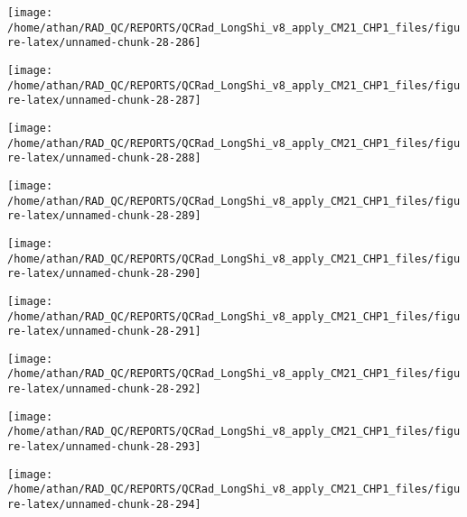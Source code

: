 \documentclass[
  10pt,
  a4paper,oneside]{article}
\begin{document}
\begin{center}\texttt{[image: /home/athan/RAD\_QC/REPORTS/QCRad\_LongShi\_v8\_apply\_CM21\_CHP1\_files/figure-latex/unnamed-chunk-28-286]} \end{center}

\begin{center}\texttt{[image: /home/athan/RAD\_QC/REPORTS/QCRad\_LongShi\_v8\_apply\_CM21\_CHP1\_files/figure-latex/unnamed-chunk-28-287]} \end{center}

\begin{center}\texttt{[image: /home/athan/RAD\_QC/REPORTS/QCRad\_LongShi\_v8\_apply\_CM21\_CHP1\_files/figure-latex/unnamed-chunk-28-288]} \end{center}

\begin{center}\texttt{[image: /home/athan/RAD\_QC/REPORTS/QCRad\_LongShi\_v8\_apply\_CM21\_CHP1\_files/figure-latex/unnamed-chunk-28-289]} \end{center}

\begin{center}\texttt{[image: /home/athan/RAD\_QC/REPORTS/QCRad\_LongShi\_v8\_apply\_CM21\_CHP1\_files/figure-latex/unnamed-chunk-28-290]} \end{center}

\begin{center}\texttt{[image: /home/athan/RAD\_QC/REPORTS/QCRad\_LongShi\_v8\_apply\_CM21\_CHP1\_files/figure-latex/unnamed-chunk-28-291]} \end{center}

\begin{center}\texttt{[image: /home/athan/RAD\_QC/REPORTS/QCRad\_LongShi\_v8\_apply\_CM21\_CHP1\_files/figure-latex/unnamed-chunk-28-292]} \end{center}

\begin{center}\texttt{[image: /home/athan/RAD\_QC/REPORTS/QCRad\_LongShi\_v8\_apply\_CM21\_CHP1\_files/figure-latex/unnamed-chunk-28-293]} \end{center}

\begin{center}\texttt{[image: /home/athan/RAD\_QC/REPORTS/QCRad\_LongShi\_v8\_apply\_CM21\_CHP1\_files/figure-latex/unnamed-chunk-28-294]} \end{center}
\end{document}
